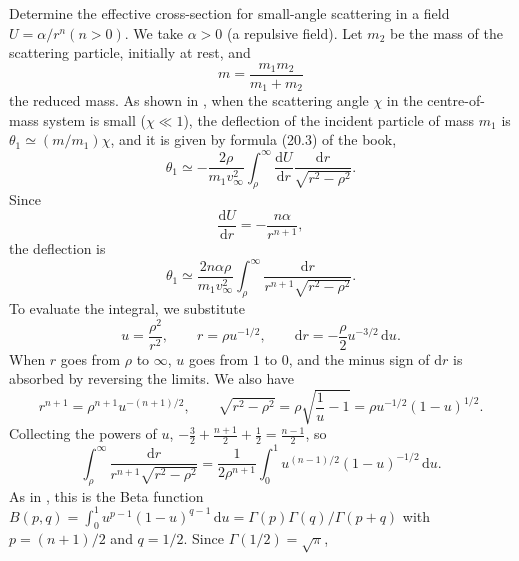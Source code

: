 \begin{problem}[title={Small-angle cross-section in a field \texorplain{$\alpha/r^n$}{α/rⁿ}}]
{
Determine the effective cross-section for small-angle scattering in a field $U = \alpha/r^n \left( n > 0 \right)$.
}
{
We take $\alpha > 0$ (a repulsive field). Let $m_2$ be the mass of the scattering particle, initially at rest, and
\begin{equation*}
    m = \frac{m_1m_2}{m_1 + m_2}
\end{equation*}
the reduced mass. As shown in , when the scattering angle $\chi$ in the centre-of-mass system is small ($\chi \ll 1$), the deflection of the incident particle of mass $m_1$ is $\theta_1 \simeq (m/m_1)\chi$, and it is given by formula (20.3) of the book,
\begin{equation*}
    \theta_1 \simeq -\frac{2\rho}{m_1v_\infty^2}\int_\rho^\infty \frac{\mathrm{d}U}{\mathrm{d}r}\frac{\mathrm{d}r}{\sqrt{r^2 - \rho^2}}.
\end{equation*}
Since
\begin{equation*}
    \frac{\mathrm{d}U}{\mathrm{d}r} = -\frac{n\alpha}{r^{n+1}},
\end{equation*}
the deflection is
\begin{equation*}
    \theta_1 \simeq \frac{2n\alpha\rho}{m_1v_\infty^2}\int_\rho^\infty \frac{\mathrm{d}r}{r^{n+1}\sqrt{r^2 - \rho^2}}.
\end{equation*}
To evaluate the integral, we substitute
\begin{equation*}
    u = \frac{\rho^2}{r^2}, \qquad r = \rho u^{-1/2}, \qquad \mathrm{d}r = -\frac{\rho}{2}u^{-3/2}\,\mathrm{d}u.
\end{equation*}
When $r$ goes from $\rho$ to $\infty$, $u$ goes from $1$ to $0$, and the minus sign of $\mathrm{d}r$ is absorbed by reversing the limits. We also have
\begin{equation*}
    r^{n+1} = \rho^{n+1}u^{-(n+1)/2}, \qquad \sqrt{r^2 - \rho^2} = \rho\sqrt{\frac{1}{u} - 1} = \rho u^{-1/2}(1 - u)^{1/2}.
\end{equation*}
Collecting the powers of $u$, $-\frac{3}{2} + \frac{n+1}{2} + \frac{1}{2} = \frac{n-1}{2}$, so
\begin{equation*}
    \int_\rho^\infty \frac{\mathrm{d}r}{r^{n+1}\sqrt{r^2 - \rho^2}} = \frac{1}{2\rho^{n+1}}\int_0^1 u^{(n-1)/2}(1 - u)^{-1/2}\,\mathrm{d}u.
\end{equation*}
As in , this is the Beta function $B(p,q) = \int_0^1 u^{p-1}(1 - u)^{q-1}\,\mathrm{d}u = \Gamma(p)\Gamma(q)/\Gamma(p+q)$ with $p = (n+1)/2$ and $q = 1/2$. Since $\Gamma(1/2) = \sqrt{\pi}$,
}
\end{problem}
